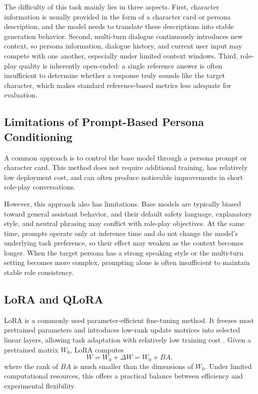 \documentclass{article}
\begin{document}
The difficulty of this task mainly lies in three aspects. First, character
information is usually provided in the form of a character card or persona
description, and the model needs to translate these descriptions into stable
generation behavior. Second, multi-turn dialogue continuously introduces new
context, so persona information, dialogue history, and current user input may
compete with one another, especially under limited context windows. Third,
role-play quality is inherently open-ended: a single reference answer is often
insufficient to determine whether a response truly sounds like the target
character, which makes standard reference-based metrics less adequate for
evaluation.

\subsection{Limitations of Prompt-Based Persona Conditioning}

A common approach is to control the base model through a persona prompt or
character card. This method does not require additional training, has
relatively low deployment cost, and can often produce noticeable improvements
in short role-play conversations.

However, this approach also has limitations. Base models are typically biased
toward general assistant behavior, and their default safety language,
explanatory style, and neutral phrasing may conflict with role-play objectives.
At the same time, prompts operate only at inference time and do not change the
model's underlying task preference, so their effect may weaken as the context
becomes longer. When the target persona has a strong speaking style or the
multi-turn setting becomes more complex, prompting alone is often insufficient
to maintain stable role consistency.

\subsection{LoRA and QLoRA}

LoRA is a commonly used parameter-efficient fine-tuning method. It freezes most
pretrained parameters and introduces low-rank update matrices into selected
linear layers, allowing task adaptation with relatively low training cost
\citep{hu2022lora}. Given a pretrained matrix $W_0$, LoRA computes
\begin{equation}
  W = W_0 + \Delta W = W_0 + BA,
\end{equation}
where the rank of $BA$ is much smaller than the dimensions of $W_0$. Under
limited computational resources, this offers a practical balance between
efficiency and experimental flexibility.
\end{document}
